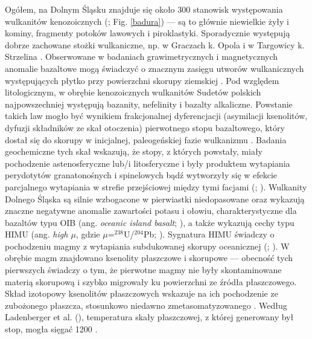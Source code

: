 \documentclass[11.5pt,twoside]{report}
\begin{document}
 Ogółem, na Dolnym Śląsku znajduje się około 300 stanowisk występowania wulkanitów kenozoicznych (\cite{Badura.2005}; Fig. \ref{badura}) --- są to głównie niewielkie żyły i kominy, fragmenty potoków lawowych i piroklastyki. Sporadycznie występują dobrze zachowane stożki wulkaniczne, np. w Graczach k. Opola i w Targowicy k. Strzelina \parencite{Krzeminska.2011}. Obserwowane w badaniach grawimetrycznych i magnetycznych anomalie bazaltowe mogą świadczyć o znacznym zasięgu utworów wulkanicznych występujących płytko przy powierzchni skorupy ziemskiej \parencite{Badura.2004}. Pod względem litologicznym, w obrębie kenozoicznych wulkanitów Sudetów polskich najpowszechniej występują bazanity, nefelinity i bazalty alkaliczne. Powstanie takich law mogło być wynikiem frakcjonalnej dyferencjacji (asymilacji ksenolitów, dyfuzji składników ze skał otoczenia) pierwotnego stopu bazaltowego, który dostał się do skorupy w inicjalnej, paleogeńskiej fazie wulkanizmu \parencite{Szymkowiak.1985}. Badania geochemiczne tych skał wskazują, że stopy, z których powstały, miały pochodzenie astenosferyczne lub/i litosferyczne i były produktem wytapiania perydotytów granatonośnych i spinelowych bąd\'{z} wytworzyły się w efekcie parcjalnego wytapiania w strefie przejściowej między tymi facjami (\cite{Puziewicz.2011}; \cite{Wilson.2006}). Wulkanity Dolnego Śląska są silnie wzbogacone w pierwiastki niedopasowane oraz wykazują znaczne negatywne anomalie zawartości potasu i ołowiu, charakterystyczne dla bazaltów typu OIB (ang. \textit{oceanic island basalt}; \cite{Ladenberger.2009}), a także wykazują cechy typu HIMU (ang. \textit{high $\mu$}, gdzie $\mu$=$^{238}$U/$^{204}$Pb; \cite{Wilson.1991}). Sygnatura HIMU świadczy o pochodzeniu magmy z wytapiania subdukowanej skorupy oceanicznej (\cite{Wilson.2001}; \cite{Helffrich.2001}). W obrębie magm znajdowano ksenolity płaszczowe i skorupowe --- obecność tych pierwszych świadczy o tym, że pierwotne magmy nie były skontaminowane materią skorupową i szybko migrowały ku powierzchni ze \'{z}ródła płaszczowego. Skład izotopowy ksenolitów płaszczowych wskazuje na ich pochodzenie ze zubożonego płaszcza, stosunkowo niedawno zmetasomatyzowanego \parencite{Ladenberger.2009}. Według Ladenberger et al. (\citeyear{Ladenberger.2009}), temperatura skały płaszczowej, z której generowany był stop, mogła sięgać 1200 \textcelsius.
 
\end{document}
